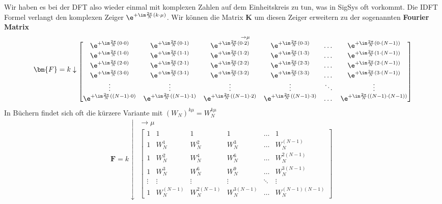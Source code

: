 Wir haben es bei der DFT also wieder einmal mit komplexen Zahlen auf dem Einheitskreis zu
tun, was in SigSys oft vorkommt.
%
Die IDFT Formel verlangt den komplexen Zeiger $\e^{+\im\frac{2\pi}{N} (k\cdot \mu)}$.
Wir können die Matrix $\bm{K}$ um diesen Zeiger erweitern zu der sogenannten
\textbf{Fourier Matrix}
\begin{align}
\label{eq:FourierMatrix}
\bm{F} =
k \downarrow
\substack{\rightarrow \mu\\
\begin{bmatrix}
\e^{+\im\frac{2\pi}{N} (0 \cdot 0)} & \e^{+\im\frac{2\pi}{N} (0 \cdot 1)} & \e^{+\im\frac{2\pi}{N} (0 \cdot 2)} & \e^{+\im\frac{2\pi}{N} (0 \cdot 3)} & \dots & \e^{+\im\frac{2\pi}{N} (0 \cdot (N-1))}\\
\e^{+\im\frac{2\pi}{N} (1 \cdot 0)} & \e^{+\im\frac{2\pi}{N} (1 \cdot 1)} & \e^{+\im\frac{2\pi}{N} (1 \cdot 2)} & \e^{+\im\frac{2\pi}{N} (1 \cdot 3)} & \dots & \e^{+\im\frac{2\pi}{N} (1 \cdot (N-1))} \\
\e^{+\im\frac{2\pi}{N} (2 \cdot 0)} & \e^{+\im\frac{2\pi}{N} (2 \cdot 1)} & \e^{+\im\frac{2\pi}{N} (2 \cdot 2)} & \e^{+\im\frac{2\pi}{N} (2 \cdot 3)} & \dots & \e^{+\im\frac{2\pi}{N} (2 \cdot (N-1))}\\
\e^{+\im\frac{2\pi}{N} (3 \cdot 0)} & \e^{+\im\frac{2\pi}{N} (3 \cdot 1)} & \e^{+\im\frac{2\pi}{N} (3 \cdot 2)} & \e^{+\im\frac{2\pi}{N} (3 \cdot 3)} & \dots & \e^{+\im\frac{2\pi}{N} (3 \cdot (N-1))}\\
\vdots & \vdots & \vdots & \vdots & \ddots & \vdots\\
\e^{+\im\frac{2\pi}{N} ((N-1) \cdot 0)} & \e^{+\im\frac{2\pi}{N} ((N-1) \cdot 1)} & \e^{+\im\frac{2\pi}{N} ((N-1) \cdot 2)} & \e^{+\im\frac{2\pi}{N} ((N-1) \cdot 3)} & \dots &  \e^{+\im\frac{2\pi}{N} ((N-1) \cdot (N-1))}
\end{bmatrix}
}
\end{align}
In Büchern findet sich oft die kürzere Variante mit $(W_N)^{k \mu} = W_N^{k \mu}$
\begin{align}
\bm{F} =
k \downarrow
\substack{\rightarrow \mu\\
\begin{bmatrix}
1 & 1 & 1 & 1 & \dots & 1\\[1em]
1 & W_N^1 & W_N^2 & W_N^3 & \dots & W_N^{(N-1)}\\[1em]
1 & W_N^2 & W_N^4 & W_N^6 & \dots & W_N^{2(N-1)}\\[1em]
1 & W_N^3 & W_N^6 & W_N^9 & \dots & W_N^{3(N-1)}\\[1em]
\vdots & \vdots & \vdots &\vdots &\ddots & \vdots\\[1em]
1 & W_N^{(N-1)} & W_N^{2(N-1)} & W_N^{3(N-1)} & \dots & W_N^{(N-1)(N-1)}
\end{bmatrix}
}
\end{align}
